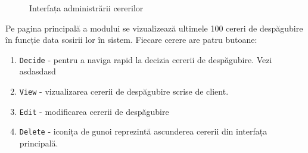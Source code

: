 	\begin{figure}
		\caption{Interfața administrării cererilor}
	\end{figure}


	Pe pagina principală a modului se vizualizează ultimele 100 cereri de despăgubire în funcție data sosirii lor în sistem.
	Fiecare cerere are patru butoane:
	\begin{enumerate}
		\item \verb|Decide| - pentru a naviga rapid la decizia cererii de despăgubire. Vezi asdasdasd
		\item \verb|View| - vizualizarea cererii de despăgubire scrise de client.
		\item \verb|Edit| - modificarea cererii de despăgubire
		\item \verb|Delete| - iconița de gunoi reprezintă ascunderea cererii din interfața principală.

	\end{enumerate}

